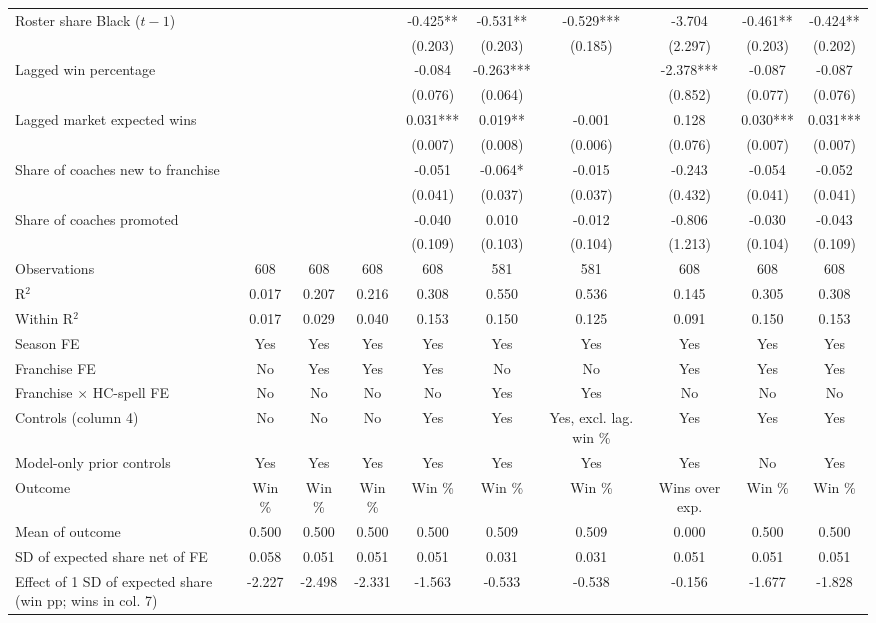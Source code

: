 \begin{table}[H]
{\begin{tabular}[t]{lccccccccc}
Roster share Black ($t-1$) &  &  &  & -0.425** & -0.531** & -0.529*** & -3.704 & -0.461** & -0.424**\\
 &  &  &  & (0.203) & (0.203) & (0.185) & (2.297) & (0.203) & (0.202)\\
Lagged win percentage &  &  &  & -0.084 & -0.263*** &  & -2.378*** & -0.087 & -0.087\\
 &  &  &  & (0.076) & (0.064) &  & (0.852) & (0.077) & (0.076)\\
Lagged market expected wins &  &  &  & 0.031*** & 0.019** & -0.001 & 0.128 & 0.030*** & 0.031***\\
 &  &  &  & (0.007) & (0.008) & (0.006) & (0.076) & (0.007) & (0.007)\\
Share of coaches new to franchise &  &  &  & -0.051 & -0.064* & -0.015 & -0.243 & -0.054 & -0.052\\
 &  &  &  & (0.041) & (0.037) & (0.037) & (0.432) & (0.041) & (0.041)\\
Share of coaches promoted &  &  &  & -0.040 & 0.010 & -0.012 & -0.806 & -0.030 & -0.043\\
 &  &  &  & (0.109) & (0.103) & (0.104) & (1.213) & (0.104) & (0.109)\\
\midrule
Observations & 608 & 608 & 608 & 608 & 581 & 581 & 608 & 608 & 608\\
R$^2$ & 0.017 & 0.207 & 0.216 & 0.308 & 0.550 & 0.536 & 0.145 & 0.305 & 0.308\\
Within R$^2$ & 0.017 & 0.029 & 0.040 & 0.153 & 0.150 & 0.125 & 0.091 & 0.150 & 0.153\\
Season FE & Yes & Yes & Yes & Yes & Yes & Yes & Yes & Yes & Yes\\
Franchise FE & No & Yes & Yes & Yes & No & No & Yes & Yes & Yes\\
Franchise $\times$ HC-spell FE & No & No & No & No & Yes & Yes & No & No & No\\
Controls (column 4) & No & No & No & Yes & Yes & Yes, excl. lag. win \% & Yes & Yes & Yes\\
Model-only prior controls & Yes & Yes & Yes & Yes & Yes & Yes & Yes & No & Yes\\
Outcome & Win \% & Win \% & Win \% & Win \% & Win \% & Win \% & Wins over exp. & Win \% & Win \%\\
Mean of outcome & 0.500 & 0.500 & 0.500 & 0.500 & 0.509 & 0.509 & 0.000 & 0.500 & 0.500\\
SD of expected share net of FE & 0.058 & 0.051 & 0.051 & 0.051 & 0.031 & 0.031 & 0.051 & 0.051 & 0.051\\
Effect of 1 SD of expected share (win pp; wins in col. 7) & -2.227 & -2.498 & -2.331 & -1.563 & -0.533 & -0.538 & -0.156 & -1.677 & -1.828\\

\end{tabular}}
\end{table}
